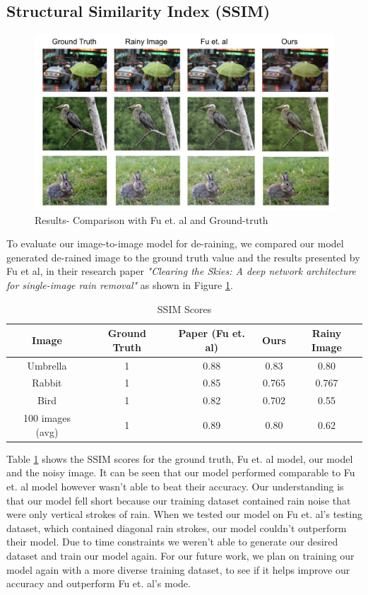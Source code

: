 \documentclass{article}
\begin{document}
\subsection{Structural Similarity Index (SSIM)}


\begin{figure}[H]
	\centering
	\includegraphics[width=\linewidth]{images/ssim.png}
	\caption{Results- Comparison with Fu et. al and Ground-truth}
	\label{figure:2}
\end{figure}

To evaluate our image-to-image model for de-raining, we compared our model generated de-rained image to the ground truth value and the results presented by Fu et al, in their research paper \textit{"Clearing the Skies: A deep network architecture for single-image rain removal"} as shown in Figure \ref{figure:2}. 

\begin{table} [h!]
\centering
\begin{tabular}{ | c | c | c | c | c |}
\hline
 Image & Ground Truth & Paper (Fu et. al) & Ours & Rainy Image \\ 
\hline
 Umbrella & 1 & 0.88 & 0.83 & 0.80 \\
 Rabbit & 1 & 0.85 & 0.765 & 0.767 \\
 Bird & 1 & 0.82 & 0.702 & 0.55 \\
 100 images (avg) & 1 & 0.89 & 0.80 & 0.62 \\
 \hline
\end{tabular}
\caption{SSIM Scores}
\label{table:2}
\end{table}

Table \ref{table:2} shows the SSIM scores for the ground truth, Fu et. al model, our model and the noisy image. It can be seen that our model performed comparable to Fu et. al model however wasn't able to beat their accuracy. Our understanding is that our model fell short because our training dataset contained rain noise that were only vertical strokes of rain. When we tested our model on Fu et. al's testing dataset, which contained diagonal rain strokes, our model couldn't outperform their model. Due to time constraints we weren't able to generate our desired dataset and train our model again. For our future work, we plan on training our model again with a more diverse training dataset, to see if it helps improve our accuracy and outperform Fu et. al's mode. 
\end{document}
